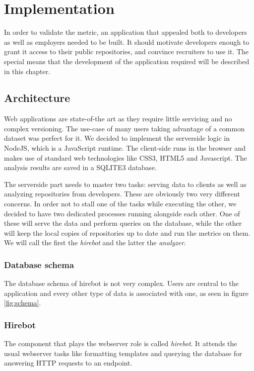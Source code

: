 \chapter{Implementation}\label{ch:implementation}
In order to validate the metric,
an application that appealed both to developers as well as employers
needed to be built. It should motivate developers enough to grant it access to their
public repositories, and convince recruiters to use it. The special means that
the development of the application required will be described in this chapter.

\section{Architecture}
Web applications are state-of-the art as they require little servicing
and no complex versioning. The use-case of many users taking
advantage of a common dataset was perfect for it.
We decided to implement the serverside logic in NodeJS, which is a
JavaScript runtime. The client-side runs in the browser and makes
use of standard web technologies like CSS3, HTML5 and Javascript.
The analysis results are saved in a SQLITE3 database.
\newline

The serverside part needs to master two tasks: serving data to clients
as well as analyzing repositories from developers.
These are obviously two very different concerns.
In order not to stall one of the tasks while executing the other,
we decided to have two dedicated processes running alongside each other.
One of these will serve the data and perform queries on the database,
while the other will keep the local copies of repositories up to date and run
the metrics on them. We will call the first the \textit{hirebot} and the
latter the \textit{analyzer}.

\subsection{Database schema}
The database schema of hirebot is not very complex.
Users are central to the application and every other type of data
is associated with one, as seen in figure \ref{fig:schema}.

\subsection{Hirebot}
The component that plays the webserver role is called \textit{hirebot}.
It attends the usual webserver tasks like formatting templates and querying
the database for answering HTTP requests to an endpoint.
\newline

